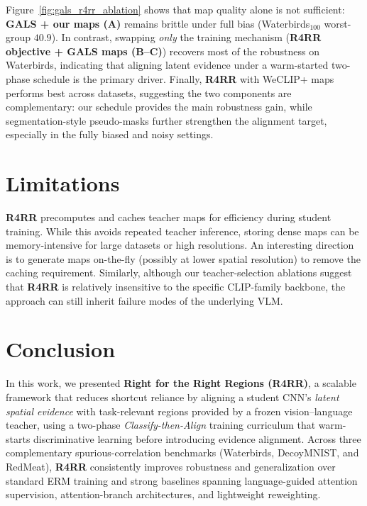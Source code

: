 Figure~\ref{fig:gals_r4rr_ablation} shows that map quality alone is not sufficient: \textbf{GALS + our maps (A)} remains brittle under full bias (Waterbirds$_{100}$ worst-group $40.9$). In contrast, swapping \emph{only} the training mechanism (\textbf{R4RR objective + GALS maps (B--C)}) recovers most of the robustness on Waterbirds, indicating that aligning {latent} evidence under a warm-started two-phase schedule is the primary driver. Finally, \textbf{R4RR} with WeCLIP+ maps performs best across datasets, suggesting the two components are complementary: our schedule provides the main robustness gain, while segmentation-style pseudo-masks further strengthen the alignment target, especially in the fully biased and noisy settings.

\section{Limitations}
\textbf{R4RR} precomputes and caches teacher maps for efficiency during student training. While this avoids repeated teacher inference, storing dense maps can be memory-intensive for large datasets or high resolutions. An interesting direction is to generate maps on-the-fly (possibly at lower spatial resolution) to remove the caching requirement. Similarly, although our teacher-selection ablations suggest that \textbf{R4RR} is relatively insensitive to the specific CLIP-family backbone, the approach can still inherit failure modes of the underlying VLM. 


\section{Conclusion}
In this work, we presented \textbf{Right for the Right Regions (R4RR)}, a scalable framework that reduces shortcut reliance by aligning a student CNN’s \emph{latent spatial evidence} with task-relevant regions provided by a frozen vision--language teacher, using a two-phase \emph{Classify-then-Align} training curriculum that warm-starts discriminative learning before introducing evidence alignment. Across three complementary spurious-correlation benchmarks (Waterbirds, DecoyMNIST, and RedMeat), \textbf{R4RR} consistently improves robustness and generalization over standard ERM training and strong baselines spanning language-guided attention supervision, attention-branch architectures, and lightweight reweighting. 


